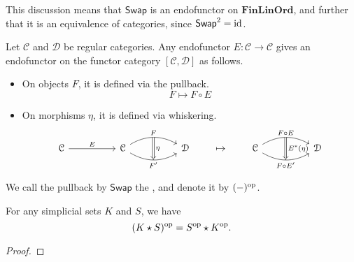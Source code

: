 \documentclass[main.tex]{subfiles}
\begin{document}
This discussion means that $\mathsf{Swap}$ is an endofunctor on $\mathbf{FinLinOrd}$, and further that it is an equivalence of categories, since $\mathsf{Swap}^{2} = \mathrm{id}$.

Let $\mathcal{C}$ and $\mathcal{D}$ be regular categories. Any endofunctor $E\colon \mathcal{C} \to \mathcal{C}$ gives an endofunctor on the functor category $[\mathcal{C}, \mathcal{D}]$ as follows.
\begin{itemize}
  \item On objects $F$, it is defined via the pullback.
    \begin{equation*}
      F \mapsto F \circ E
    \end{equation*}

  \item On morphisms $\eta$, it is defined via whiskering.
    \begin{equation*}
      \begin{tikzcd}[column sep=huge]
        \mathcal{C}
        \arrow[r, "E"]
        &\mathcal{C}
        \arrow[r, bend left, "F"{name=U}]
        \arrow[r, bend right, swap, "F'"{name=D}]
        & \mathcal{D}
        \arrow[from=U, to=D, Rightarrow, "\eta"]
      \end{tikzcd}
      \qquad
      \mapsto
      \qquad
      \begin{tikzcd}[column sep=huge]
        \mathcal{C}
        \arrow[r, bend left, "F \circ E"{name=U}]
        \arrow[r, bend right, swap, "F \circ E'"{name=D}]
        & \mathcal{D}
        \arrow[from=U, to=D, Rightarrow, "E^{*}(\eta)"]
      \end{tikzcd}
    \end{equation*}

\end{itemize}
\begin{definition}
  \label{def:opposite_functor}
  We call the pullback by $\mathsf{Swap}$ the , and denote it by $(-)^{\mathrm{op}}$.
\end{definition}

\begin{theorem}
  For any simplicial sets $K$ and $S$, we have
  \begin{equation*}
    (K \star S)^{\mathrm{op}} = S^{\mathrm{op}} \star K^{\mathrm{op}}.
  \end{equation*}
\end{theorem}
\begin{proof}

\end{proof}
\end{document}
